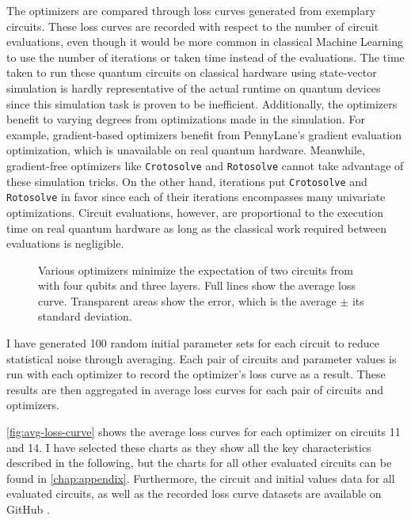 The optimizers are compared through loss curves generated from exemplary
circuits.
These loss curves are recorded with respect to the number of circuit
evaluations, even though it would be more common in classical Machine Learning
to use the number of iterations or taken time instead of the evaluations.
The time taken to run these quantum circuits on classical hardware using
state-vector simulation is hardly representative of the actual runtime on
quantum devices since this simulation task is proven to be inefficient.
Additionally, the optimizers benefit to varying degrees from optimizations made
in the simulation.
For example, gradient-based optimizers benefit from PennyLane's gradient
evaluation optimization, which is unavailable on real quantum hardware.
Meanwhile, gradient-free optimizers like \texttt{Crotosolve} and
\texttt{Rotosolve} cannot take advantage of these simulation tricks.
On the other hand, iterations put \texttt{Crotosolve} and \texttt{Rotosolve} in
favor since each of their iterations encompasses many univariate optimizations.
Circuit evaluations, however, are proportional to the execution time on real
quantum hardware as long as the classical work required between evaluations is
negligible.

\begin{figure}
    \centering
    \caption{Various optimizers minimize the expectation of two circuits from
        \cite{sim_expressibility_2019} with four qubits and three layers.
        Full lines show the average loss curve.
        Transparent areas show the error, which is the average $\pm$ its
        standard deviation.}
    \label{fig:avg-loss-curve}
\end{figure}

I have generated 100 random initial parameter sets for each circuit to reduce
statistical noise through averaging.
Each pair of circuits and parameter values is run with each optimizer to
record the optimizer's loss curve as a result.
These results are then aggregated in average loss curves for each pair of
circuits and optimizers.

\autoref{fig:avg-loss-curve} shows the average loss curves for each
optimizer on circuits 11 and 14.
I have selected these charts as they show all the key characteristics described
in the following, but the charts for all other evaluated circuits can be found
in \autoref{chap:appendix}.
Furthermore, the circuit and initial values data for all evaluated circuits, as
well as the recorded loss curve datasets are available on GitHub
\cite{schweikart_schweikartcrotosolve_2023}.

